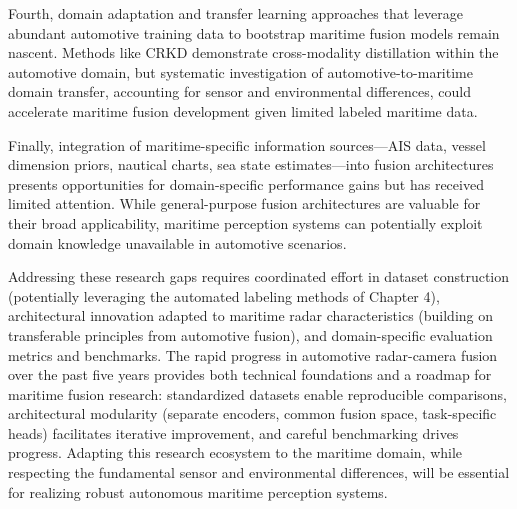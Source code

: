 Fourth, domain adaptation and transfer learning approaches that leverage abundant automotive training data to bootstrap maritime fusion models remain nascent. Methods like CRKD \cite{Zhao2024CRKD} demonstrate cross-modality distillation within the automotive domain, but systematic investigation of automotive-to-maritime domain transfer, accounting for sensor and environmental differences, could accelerate maritime fusion development given limited labeled maritime data.

Finally, integration of maritime-specific information sources—AIS data, vessel dimension priors, nautical charts, sea state estimates—into fusion architectures presents opportunities for domain-specific performance gains but has received limited attention. While general-purpose fusion architectures are valuable for their broad applicability, maritime perception systems can potentially exploit domain knowledge unavailable in automotive scenarios.

Addressing these research gaps requires coordinated effort in dataset construction (potentially leveraging the automated labeling methods of Chapter 4), architectural innovation adapted to maritime radar characteristics (building on transferable principles from automotive fusion), and domain-specific evaluation metrics and benchmarks. The rapid progress in automotive radar-camera fusion over the past five years provides both technical foundations and a roadmap for maritime fusion research: standardized datasets enable reproducible comparisons, architectural modularity (separate encoders, common fusion space, task-specific heads) facilitates iterative improvement, and careful benchmarking drives progress. Adapting this research ecosystem to the maritime domain, while respecting the fundamental sensor and environmental differences, will be essential for realizing robust autonomous maritime perception systems.
